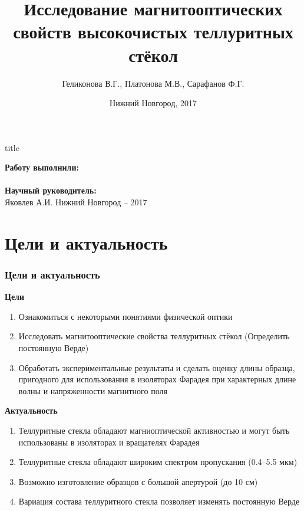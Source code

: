 \documentclass[10pt,pdf,hyperref={unicode}, dvipsnames]{beamer}
\title[Магнитооптическая активность теллуритных стёкол]{Исследование магнитооптических свойств высокочистых теллуритных стёкол}
\author{%
	Геликонова В.Г., %
	Платонова М.В., %
	Сарафанов Ф.Г. %
}
\institute{Радиофизический факультет ННГУ, 420 группа}
\date{Нижний Новгород, 2017}
\begin{document}
  

\begin{frame}[plain]
	\centering
	\vspace{2cm}
	\begin{beamercolorbox}[sep=8pt,center]{title}
		\bf{}\inserttitle
	\end{beamercolorbox}
	\vspace{0.5cm}
	\normalsize \textbf{Работу выполнили:}\\
	\large\insertauthor\\ 
	\vspace{0.5cm}
	\normalsize{\textbf{Научный руководитель:}\\}
	\large{Яковлев А.И.}
	\vfill
	\small{Нижний Новгород -- 2017}
\end{frame}
\section{Цели и актуальность}
\begin{frame}[t]
	\frametitle{Цели и актуальность}
	\textbf{Цели}\\
	\begin{enumerate}
		\item Ознакомиться с некоторыми понятиями физической оптики
		\item Исследовать магнитооптические свойства теллуритных стёкол (Определить постоянную Верде)
		\item Обработать экспериментальные  результаты и сделать оценку длины образца, пригодного для использования в изоляторах Фарадея 
		при характерных длине волны и напряженности магнитного поля
	\end{enumerate}
	\textbf{Актуальность}\\
	\begin{enumerate}
		\item Теллуритные стекла обладают магниоптической активностью и могут быть использованы в изоляторах и вращателях Фарадея
		\item Теллуритные стекла обладают широким спектром пропускания (0.4--5.5  мкм) %
		\item Возможно изготовление образцов с большой апертурой (до 10 см)
		\item Вариация состава теллуритного стекла позволяет изменять постоянную Верде
	\end{enumerate}
\end{frame}
\end{document}
